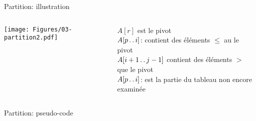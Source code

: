 \begin{frame}{Partition: illustration}

\begin{columns}
\begin{column}{4cm}
\centerline{\texttt{[image: Figures/03-partition2.pdf]}}
\end{column}
\begin{column}{6cm}\small
$A[r]$ est le pivot\\
$A[p\mathinner{\ldotp\ldotp} i]$: contient des éléments $\leq$ au le pivot\\
$A[i+1\mathinner{\ldotp\ldotp} j-1]$ contient des éléments $>$ que le pivot\\
$A[p\mathinner{\ldotp\ldotp} i]$: est la partie du tableau non encore examinée
\end{column}
\end{columns}

\end{frame}

\begin{frame}{Partition: pseudo-code}

\begin{center}
\end{center}

\end{frame}

